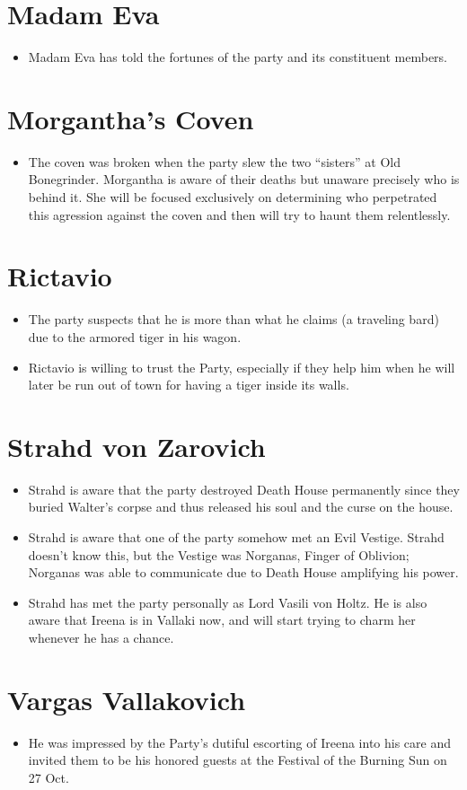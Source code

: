 \documentclass[a4paper,11pt]{article}
\begin{document}
\section{Madam Eva}
\begin{itemize}
  \item Madam Eva has told the fortunes of the party and its constituent members.
\end{itemize}

\section{Morgantha's Coven}
\begin{itemize}
  \item The coven was broken when the party slew the two ``sisters'' at Old Bonegrinder. Morgantha is aware of 
  their deaths but unaware precisely who is behind it. She will be focused exclusively on determining who 
  perpetrated this agression against the coven and then will try to haunt them relentlessly.
\end{itemize}

\section{Rictavio}
\begin{itemize}
  \item The party suspects that he is more than what he claims (a traveling bard) due to the armored tiger in his 
  wagon.
  \item Rictavio is willing to trust the Party, especially if they help him when he will later be run out of town
  for having a tiger inside its walls.
\end{itemize}

\section{Strahd von Zarovich}
\begin{itemize}
  \item Strahd is aware that the party destroyed Death House permanently since they buried Walter's corpse and 
  thus released his soul and the curse on the house.
  \item Strahd is aware that one of the party somehow met an Evil Vestige. Strahd doesn't know this, but the 
  Vestige was Norganas, Finger of Oblivion; Norganas was able to communicate due to Death House amplifying his 
  power.
  \item Strahd has met the party personally as Lord Vasili von Holtz. He is also aware that Ireena is in Vallaki 
  now, and will start trying to charm her whenever he has a chance.
\end{itemize}

\section{Vargas Vallakovich}
\begin{itemize}
  \item He was impressed by the Party's dutiful escorting of Ireena into his care and invited them to be his
  honored guests at the Festival of the Burning Sun on 27 Oct.
\end{itemize}
\end{document}

